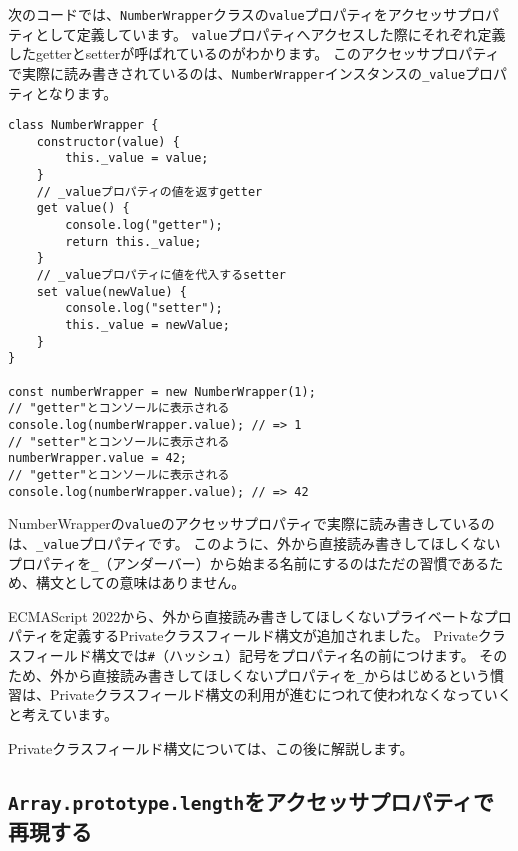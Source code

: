 次のコードでは、\texttt{NumberWrapper}クラスの\texttt{value}プロパティをアクセッサプロパティとして定義しています。
\texttt{value}プロパティへアクセスした際にそれぞれ定義したgetterとsetterが呼ばれているのがわかります。
このアクセッサプロパティで実際に読み書きされているのは、\texttt{NumberWrapper}インスタンスの\texttt{\_value}プロパティとなります。

\begin{lstlisting}
class NumberWrapper {
    constructor(value) {
        this._value = value;
    }
    // _valueプロパティの値を返すgetter
    get value() {
        console.log("getter");
        return this._value;
    }
    // _valueプロパティに値を代入するsetter
    set value(newValue) {
        console.log("setter");
        this._value = newValue;
    }
}

const numberWrapper = new NumberWrapper(1);
// "getter"とコンソールに表示される
console.log(numberWrapper.value); // => 1
// "setter"とコンソールに表示される
numberWrapper.value = 42;
// "getter"とコンソールに表示される
console.log(numberWrapper.value); // => 42
\end{lstlisting}

\begin{tcolorbox}[title=\texttt{\_}（アンダーバー）から始まるプロパティ名]\label{underbar-private-property}

NumberWrapperの\texttt{value}のアクセッサプロパティで実際に読み書きしているのは、\texttt{\_value}プロパティです。
このように、外から直接読み書きしてほしくないプロパティを\texttt{\_}（アンダーバー）から始まる名前にするのはただの習慣であるため、構文としての意味はありません。

ECMAScript 2022から、外から直接読み書きしてほしくないプライベートなプロパティを定義するPrivateクラスフィールド構文が追加されました。
Privateクラスフィールド構文では\texttt{\#}（ハッシュ）記号をプロパティ名の前につけます。
そのため、外から直接読み書きしてほしくないプロパティを\texttt{\_}からはじめるという慣習は、Privateクラスフィールド構文の利用が進むにつれて使われなくなっていくと考えています。

Privateクラスフィールド構文については、この後に解説します。
\end{tcolorbox}

\hypertarget{array-like-length}{%
\subsection{\texorpdfstring{\texttt{Array.prototype.length}をアクセッサプロパティで再現する}{Array.prototype.lengthをアクセッサプロパティで再現する}}\label{array-like-length}}

